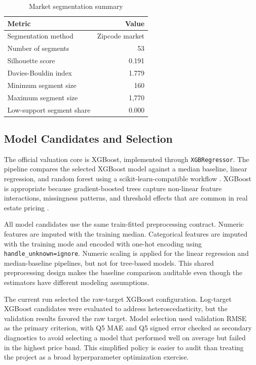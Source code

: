 \documentclass[12pt,a4paper]{article}
\begin{document}
\begin{table}[H]
\centering
\caption{Market segmentation summary}
\label{tab:segmentation}
\begin{tabular}{lr}
\toprule
\textbf{Metric} & \textbf{Value}\\
\midrule
Segmentation method & Zipcode market\\
Number of segments & 53\\
Silhouette score & 0.191\\
Davies-Bouldin index & 1.779\\
Minimum segment size & 160\\
Maximum segment size & 1,770\\
Low-support segment share & 0.000\\
\bottomrule
\end{tabular}
\end{table}

\subsection{Model Candidates and Selection}
The official valuation core is XGBoost, implemented through \texttt{XGBRegressor}. The pipeline compares the selected XGBoost model against a median baseline, linear regression, and random forest using a scikit-learn-compatible workflow \citep{pedregosa2011scikit}. XGBoost is appropriate because gradient-boosted trees capture non-linear feature interactions, missingness patterns, and threshold effects that are common in real estate pricing \citep{chen2016xgboost}.

All model candidates use the same train-fitted preprocessing contract. Numeric features are imputed with the training median. Categorical features are imputed with the training mode and encoded with one-hot encoding using \texttt{handle\_unknown=ignore}. Numeric scaling is applied for the linear regression and median-baseline pipelines, but not for tree-based models. This shared preprocessing design makes the baseline comparison auditable even though the estimators have different modeling assumptions.

The current run selected the raw-target XGBoost configuration. Log-target XGBoost candidates were evaluated to address heteroscedasticity, but the validation results favored the raw target. Model selection used validation RMSE as the primary criterion, with Q5 MAE and Q5 signed error checked as secondary diagnostics to avoid selecting a model that performed well on average but failed in the highest price band. This simplified policy is easier to audit than treating the project as a broad hyperparameter optimization exercise.
\end{document}
